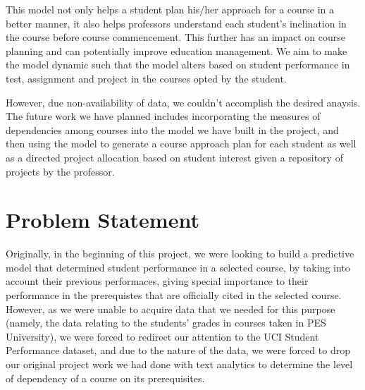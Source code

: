 \documentclass[conference]{IEEEtran}
\begin{document}
This model not only helps a student plan his/her approach for a course in a better manner, it also helps professors understand each student's inclination in the course before course commencement. This further has an impact on course planning and can potentially improve education management. We aim to make the model dynamic such that the model alters based on student performance in test, assignment and project in the courses opted by the student.

However, due non-availability of data, we couldn't accomplish the desired anaysis. The future work we have planned includes incorporating the measures of dependencies among courses into the model we have built in the project, and then using the model to generate a course approach plan for each student as well as a directed project allocation based on student interest given a repository of projects by the professor.

	\section{Problem Statement}
Originally, in the beginning of this project, we were looking to build a predictive model that determined student performance in a selected course, by taking into account their previous performaces, giving special importance to their performance in the prerequistes that are officially cited in the selected course. However, as we were unable to acquire data that we needed for this purpose (namely, the data relating to the students' grades in courses taken in PES University), we were forced to redirect our attention to the UCI Student Performance dataset\cite{Lichman:2013}\cite{ref:4}, and due to the nature of the data, we were forced to drop our original project work we had done with text analytics to determine the level of dependency of a course on its prerequisites.
\end{document}
